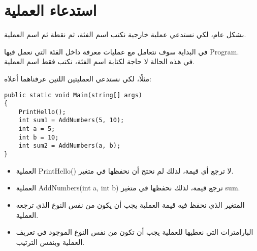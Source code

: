 \documentclass[12pt]{article}
\begin{document}
\section{استدعاء العملية}
بشكل عام، لكي نستدعي عملية خارجية نكتب اسم الفئة، ثم نقطة ثم اسم العملية.

في البداية سوف نتعامل مع عمليات معرفة داخل الفئة التي نعمل فيها \textenglish{Program}. \\
في هذه الحالة لا حاجة لكتابة اسم الفئة، نكتب فقط اسم العملية.

مثلًا، لكي نستدعي العمليتين اللتين عرفناهما أعلاه:

\begin{boxExample}
\begin{english}
\begin{verbatim}
public static void Main(string[] args)
{
    PrintHello();
    int sum1 = AddNumbers(5, 10);
    int a = 5;
    int b = 10;
    int sum2 = AddNumbers(a, b);
}
\end{verbatim}
\end{english}
\end{boxExample}


\begin{itemize}
    \item العملية \textenglish{PrintHello()} لا ترجع أي قيمة، لذلك لم نحتج أن نحفظها في متغير.
    \item العملية \textenglish{AddNumbers(int a, int b)} ترجع قيمة، لذلك نحفظها في متغير \textenglish{sum}.
    \item المتغير الذي نحفظ فيه قيمة العملية يجب أن يكون من نفس النوع الذي ترجعه العملية.
    \item البارامترات التي نعطيها للعملية يجب أن تكون من نفس النوع الموجود في تعريف العملية وبنفس الترتيب.
\end{itemize}
\end{document}
